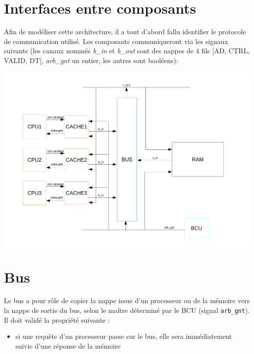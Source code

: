 \documentclass[a4paper, 11pt]{article}
\begin{document}
\section{Interfaces entre composants}
Afin de modéliser cette architecture, il a tout d'abord fallu identifier le 
protocole de communication utilisé. Les composants communiqueront via les
signaux suivants (les canaux nommés \textit{b\_in} et \textit{b\_out} sont
des nappes de 4 fils [AD, CTRL, VALID, DT], \textit{arb\_gnt} un entier,
les autres sont booléens):
\begin{center}
\centerline{\includegraphics[scale=0.5]{images/archi.pdf}}
\end{center}

\section{Bus}
Le bus a pour rôle de copier la nappe issue d'un processeur ou de la mémoire
vers la nappe de sortie du bus, selon le maître déterminé par le BCU (signal
\texttt{arb\_gnt}). Il doit validé la propriété suivante :
\begin{itemize}
  \item si une requête d'un processeur passe sur le bus, elle sera immédiatement
    suivie d'une réponse de la mémoire
\end{itemize}
\end{document}
